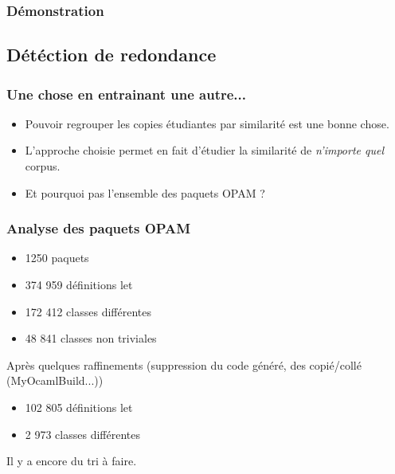 \documentclass[11pt]{beamer}
\begin{document}
\begin{frame}
\frametitle{Démonstration}
\end{frame}

\subsection{Détéction de redondance}
\begin{frame}
\frametitle{Une chose en entrainant une autre...}

\begin{itemize}
\item Pouvoir regrouper les copies étudiantes par similarité est une bonne chose.
\item L'approche choisie permet en fait d'étudier la similarité de \emph{n'importe quel} corpus.
\item Et pourquoi pas l'ensemble des paquets OPAM ?
\end{itemize}
\end{frame}

\begin{frame}
	\frametitle{Analyse des paquets OPAM}
	\begin{itemize}
		\item 1250 paquets
		\item 374 959 définitions let
		\item 172 412 classes différentes
		\item 48 841 classes non triviales
	\end{itemize}
\pause
Après quelques raffinements (suppression du code généré, des copié/collé (MyOcamlBuild...))
\begin{itemize}
	\item 102 805 définitions let
	\item 2 973 classes différentes
\end{itemize}
\pause
Il y a encore du tri à faire.
\end{frame}
\end{document}
